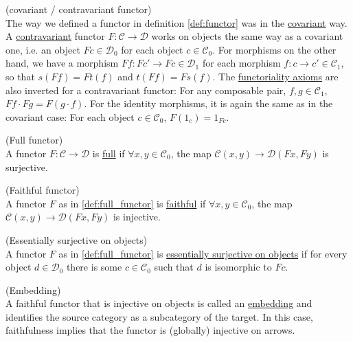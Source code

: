 \begin{definition}{(covariant / contravariant functor)}\\
The way we defined a functor in definition \ref{def:functor} was in the \ul{covariant} way.\\
A \ul{contravariant} functor $F : \mathcal{C} \rightarrow \mathcal{D}$ works on objects the same way as a covariant one, i.e.
an object $Fc \in \mathcal{D}_{0}$ for each object $c \in \mathcal{C}_{0}$. For morphisms on the other hand, we have
a morphism $F f : Fc' \rightarrow Fc \in \mathcal{D}_{1}$ for each morphism $f : c \rightarrow c' \in \mathcal{C}_{1}$, so that
$s(F f) = F t(f)$ and $t(F f) = F s(f)$.
The \ul{functoriality axioms} are also inverted for a contravariant functor:
For any composable pair, $f, g \in \mathcal{C}_{1}$, $F f \cdot F g = F(g \cdot f)$.
For the identity morphisms, it is again the same as in the covariant case:
For each object $c \in \mathcal{C}_{0}$, $F(1_{c}) = 1_{Fc}$.
\end{definition}


\begin{definition}{(Full functor)}\label{def:full_functor}\\
A functor $F : \mathcal{C} \rightarrow \mathcal{D}$ is \ul{full} if
$\forall x, y \in \mathcal{C}_{0}$, the map $\mathcal{C}(x, y) \rightarrow \mathcal{D}(Fx, Fy)$ is surjective.
\end{definition}

\begin{definition}{(Faithful functor)}\label{def:faithful_functor}\phantom{}\\
A functor $F$ as in \ref{def:full_functor} is \ul{faithful} if
$\forall x, y \in \mathcal{C}_{0}$, the map $\mathcal{C}(x, y) \rightarrow \mathcal{D}(Fx, Fy)$ is injective.
\end{definition}

\begin{definition}{(Essentially surjective on objects)}\label{def:ess_surj_o_o}\phantom{}\\
A functor $F$ as in \ref{def:full_functor} is \ul{essentially surjective on objects} if for every object $d \in \mathcal{D}_{0}$ there
is some $c \in \mathcal{C}_{0}$ such that $d$ is isomorphic to $Fc$.
\end{definition}

\begin{definition}{(Embedding)}\label{def:embedding}\phantom{}\\
A faithful functor that is injective on objects is called an \ul{embedding} and identifies the source category
as a subcategory of the target. In this case, faithfulness implies that the functor is (globally) injective on arrows.
\end{definition}

